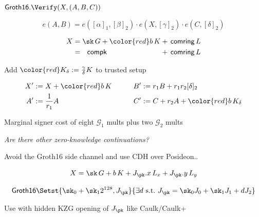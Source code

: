\documentclass{beamer}
\def\comring{\ensuremath{\mathsf{comring}}\xspace}
\def\compk{\ensuremath{\mathsf{compk}}\xspace}
\begin{document}
\begin{frame}[t] %

$\mathsf{Groth16}.\Verify(X,(A,B,C))$

$$ e(A,B) = e([\alpha]_1, [\beta]_2) \cdot e(X, [\gamma]_2) \cdot e(C, [\delta]_2) $$

\smallskip

$$ \begin{alignedat}{2}
 X &= \sk \, G + {\color{red} b \, K} &&+ \, \comring \, L \\
   &= \, \, \, \, \compk  &&+ \, \comring \, L \\
\end{alignedat} $$

\bigskip

Add $\color{red} K_\delta := {\gamma\over\delta} K$ to trusted setup

$$ \begin{aligned}
X' &:= X + {\color{red} b\, K} &\quad&&
B' &:= r_1 B + r_1 r_2 [\delta]_2 \\
A' &:= {1 \over r_1} A & &&
C' &:= C + r_2 A + {\color{red} b\, K_\delta} \\
\end{aligned} $$

\bigskip\bigskip

\hspace{5pt} Marginal signer cost of eight $\mathcal{G}_1$ mults plus two $\mathcal{G}_2$ mults 


\end{frame}






\begin{frame} %

\hspace{30pt} {\it Are there other zero-knowledge continuations?}

\bigskip\medskip

Avoid the Groth16 side channel and use CDH over Posideon.. \\ \smallskip

\bigskip\medskip

$$ X = \sk \, G + b \, K + J_\pk.x \, L_x + J_\pk.y \, L_y $$

\vspace{-20pt}
$$ \mathsf{Groth16} \Setst{ \sk_0 + \sk_1 2^{128}, J_\pk }{ 
	\exists d \textrm{\ s.t.\ }
	J_\pk = \sk_0 J_0 + \sk_1 J_1 + d J_2
} $$

\smallskip

Use with hidden KZG opening of $J_\pk$ like Caulk/Caulk+

\end{frame}
\end{document}
